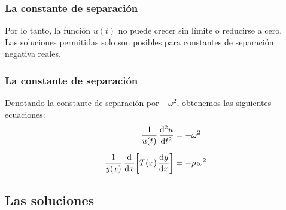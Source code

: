 \documentclass[12pt]{beamer}
\begin{document}
\begin{frame}
\frametitle{La constante de separación}
Por lo tanto, la función $u (t)$ no puede crecer sin límite o reducirse a cero.
\\
\bigskip
\pause
Las soluciones permitidas solo son posibles para constantes de separación negativa reales.
\end{frame}
\begin{frame}
\frametitle{La constante de separación}
Denotando la constante de separación por $- \omega^{2}$, obtenemos las siguientes ecuaciones:
\pause
\begin{align}
\dfrac{1}{u (t)} \, \dv[2]{u}{t} &= - \omega^{2} \label{eq:ecuacion_11} \\[0.5em]
\dfrac{1}{y (x)} \, \dv{x} \bigg[ T (x) \, \dv{y}{x} \bigg] &= - \rho \, \omega^{2} \label{eq:ecuacion_12}
\end{align}
\end{frame}

\subsection{Las soluciones}
\end{document}
